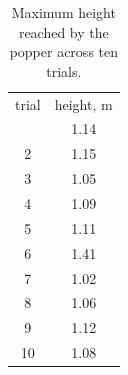 \begin{table}
  \caption{Maximum height reached by the popper across ten trials.}
  \label{tab:height}
  \begin{center}
    \begin{ruledtabular}
      \begin{tabular}{cc}
        trial & height, \unit{\meter} \\
        \colrule
        1 & \num{1.14} \\
        2 & \num{1.15} \\
        3 & \num{1.05} \\
        4 & \num{1.09} \\
        5 & \num{1.11} \\
        6 & \num{1.41} \\
        7 & \num{1.02} \\
        8 & \num{1.06} \\
        9 & \num{1.12} \\
        10 & \num{1.08} \\
      \end{tabular}
    \end{ruledtabular}
  \end{center}
\end{table}